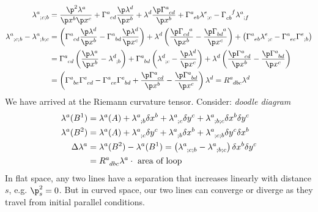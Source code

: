 \documentclass[a4paper, 11pt, normalem]{report}
\begin{document}
\begin{align}
    \tensor{\lambda}{^a_{;c;b}} &= \frac{\p^2\lambda^a}{\p x^b\p x^c} + \tensor{\Gamma}{^a_{cd}}\frac{\p\lambda^d}{\p x^b} + \lambda^d\frac{\p\tensor{\Gamma}{^a_{cd}}}{\p x^b} + \tensor{\Gamma}{^a_{eb}}\tensor{\lambda}{^e_{;c}} - \tensor{\Gamma}{_{cb}^f}\tensor{\lambda}{^a_{;f}} \\
    \tensor{\lambda}{^a_{;c;b}}-\tensor{\lambda}{^a_{;b;c}} &= \left(\tensor{\Gamma}{^a_{cd}}\frac{\p\lambda^d}{\p x^b} - \tensor{\Gamma}{^a_{bd}}\frac{\p\lambda^d}{\p x^c}\right) + \lambda^d\left(\frac{\p\tensor{\Gamma}{_{cd}^a}}{\p x^b} - \frac{\p\tensor{\Gamma}{_{bd}^a}}{\p x^c}\right) + \left(\tensor{\Gamma}{^a_{eb}}\tensor{\lambda}{^e_{;c}}-\tensor{\Gamma}{^a_{ec}}\tensor{\Gamma}{^e_{;b}}\right) \\
                                                            &= \tensor{\Gamma}{^a_{cd}}\left(\frac{\p\lambda^a}{\p x^b}-\tensor{\lambda}{^d_{;b}}\right) + \tensor{\Gamma}{^a_{bd}}\left(\tensor{\lambda}{^d_{;c}}-\frac{\p\lambda^d}{\p x^c}\right) + \lambda^d\left(\frac{\p\tensor{\Gamma}{^a_{cd}}}{\p x^b} - \frac{\p\tensor{\Gamma}{^a_{bd}}}{\p x^c}\right) \\
                                                            &= \left(\tensor{\Gamma}{^a_{be}}\tensor{\Gamma}{^e_{cd}} - \tensor{\Gamma}{^a_{ce}}\tensor{\Gamma}{^e_{bd}} + \frac{\p\tensor{\Gamma}{^a_{cd}}}{\p x^b} - \frac{\p\tensor{\Gamma}{^a_{bd}}}{\p x^c}\right)\lambda^d = \tensor{R}{^a_{dbc}}\lambda^d
\end{align}
We have arrived at the Riemann curvature tensor.
Consider:
\textit{doodle diagram}
\begin{align}
    \lambda^a(B^1) &= \lambda^a(A) + \tensor{\lambda}{^a_{;b}}\delta x^b + \tensor{\lambda}{^a_{;c}}\delta y^c + \tensor{\lambda}{^a_{;b;c}}\delta x^b\delta y^c \\
    \lambda^a(B^2) &= \lambda^a(A) + \tensor{\lambda}{^a_{;c}}\delta y^c + \tensor{\lambda}{^a_{;b}}\delta x^b + \tensor{\lambda}{^a_{;c;b}}\delta y^c\delta x^b \\
    \Delta\lambda^a &= \lambda^a(B^2)-\lambda^a(B^1) = \left(\tensor{\lambda}{^a_{;c;b}}-\tensor{\lambda}{^a_{;b;c}}\right)\delta x^b\delta y^c \\
                    &= \tensor{R}{^a_{dbc}}\lambda^a\cdot\text{ area of loop}
\end{align}
In flat space, any two lines have a separation that increases linearly with distance $s$, e.g. $\p_s^2=0$.
But in curved space, our two lines can converge or diverge as they travel from initial parallel conditions.
\end{document}

